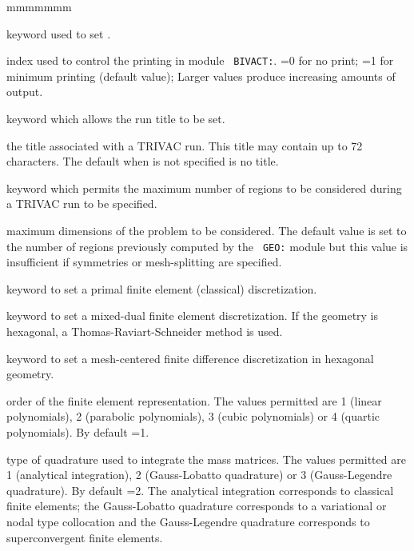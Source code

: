 \begin{ListeDeDescription}{mmmmmmm}

\item[\moc{EDIT}] keyword used to set .

\item[\dusa{iprint}] index used to control the printing  in module {\tt
BIVACT:}. =0 for no print; =1 for minimum printing (default value); Larger
values produce increasing amounts of output.

\item[\moc{TITL}] keyword which allows the run title to be set.

\item[\dusa{TITLE}] the title associated with a TRIVAC run. This
title may contain up to 72 characters. The default when  is not specified is no title.

\item[\moc{MAXR}] keyword which permits the maximum number of regions to be considered during a TRIVAC run to be specified.

\item[\dusa{maxpts}] maximum dimensions of the problem to be considered.  The
default value is set to the number of regions previously computed by the {\tt
GEO:} module but this value is insufficient if symmetries or mesh-splitting
are specified.

\item[\moc{PRIM}] keyword to set a primal finite element (classical)
discretization.

\item[\moc{DUAL}] keyword to set a mixed-dual finite element discretization. If the
geometry is hexagonal, a Thomas-Raviart-Schneider method is used.\cite{rts}

\item[\moc{MCFD}] keyword to set a mesh-centered finite difference discretization
in hexagonal geometry.

\item[\dusa{ielem}] order of the finite element representation.  The values
permitted are 1 (linear polynomials), 2 (parabolic polynomials), 3 (cubic
polynomials) or 4 (quartic polynomials). By default =1.

\item[\dusa{icol}] type of quadrature used to integrate the mass matrices. The
values permitted are 1 (analytical integration), 2  (Gauss-Lobatto quadrature)
or 3 (Gauss-Legendre quadrature). By default =2. The analytical
integration corresponds to classical finite elements; the Gauss-Lobatto
quadrature corresponds to a variational or nodal type collocation and the
Gauss-Legendre quadrature corresponds to superconvergent finite elements.


\end{ListeDeDescription}
